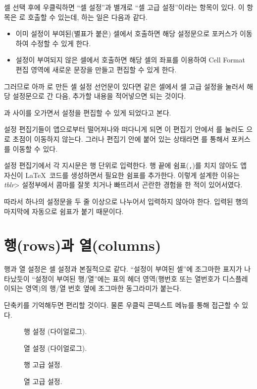 \documentclass{simplman}
\newcommand*\env[1]{\<2\textit{#1}>}
\newcommand*\guielem[1]{\colorbox{blue8!20}{\sffamily[#1]}}
\begin{document}
셀 선택 후에 우클릭하면 ``셀 설정''과 별개로 ``셀 고급 설정''이라는 항목이 있다. 이 항목은 로 호출할 수 있는데, 하는 일은 다음과 같다.
\begin{itemize} \oblivoirlist
\item 이미 설정이 부여된(별표가 붙은) 셀에서 호출하면 해당 설정문으로 포커스가 이동하여 수정할 수 있게 한다.
\item 설정이 부여되지 않은 셀에서 호출하면 해당 셀의 좌표를 이용하여 Cell Format 편집 영역에 새로운 문장을 만들고 편집할 수 있게 한다.
\end{itemize}
그러므로 아까 로 만든 셀 설정 선언문이 있다면 같은 셀에서 셀 고급 설정을 눌러서 해당 설정문으로 간 다음, 추가할 내용을 적어넣으면 되는 것이다.

\guielem{테이블 영역}과 \guielem{설정 편집 영역} 사이를 오가면서 설정을 편집할 수 있게 되었다고 본다.

\begin{Chamgo}
설정 편집기들이 앱으로부터 떨어져나와 떠다니게 되면 이 편집기 안에서 를 눌러도 \guielem{테이블 영역}으로 초점이 이동하지 않는다. 그러나 편집기 안에 붙어 있는 상태라면 를 통해서 포커스를 이동할 수 있다.
\end{Chamgo}

\begin{Chamgo}
설정 편집기에서 각 지시문은 행 단위로 입력한다. 행 끝에 쉼표(\verb|,|)를 치지 않아도 앱 자신이 \LaTeX\ 코드를 생성하면서 필요한 쉼표를 추가한다. 이렇게 설계한 이유는 \env{tblr} 설정부에서 콤마를 잘못 치거나 빠뜨려서 곤란한 경험을 한 적이 있어서였다.

따라서 하나의 설정문을 두 줄 이상으로 나누어서 입력하지 않아야 한다. 입력된 행의 마지막에 자동으로 쉼표가 붙기 때문이다.
\end{Chamgo}

\chapter{행(rows)과 열(columns)}

행과 열 설정은 셀 설정과 본질적으로 같다. ``설정이 부여된 셀''에 조그마한 표지가 나타났듯이
``설정이 부여된 행/열''에는 표의 헤더 영역(행번호 또는 열번호가 디스플레이되는 영역)의 행/열 번호 옆에 조그마한 동그라미가 붙는다.

단축키를 기억해두면 편리할 것이다. 물론 우클릭 콘텍스트 메뉴를 통해 접근할 수 있다.

\begin{description}
\item [{}] 행 설정 (다이얼로그).
\item [{}] 열 설정 (다이얼로그).
\item [{}] 행 고급 설정.
\item [{}] 열 고급 설정.
\end{description}
\end{document}
